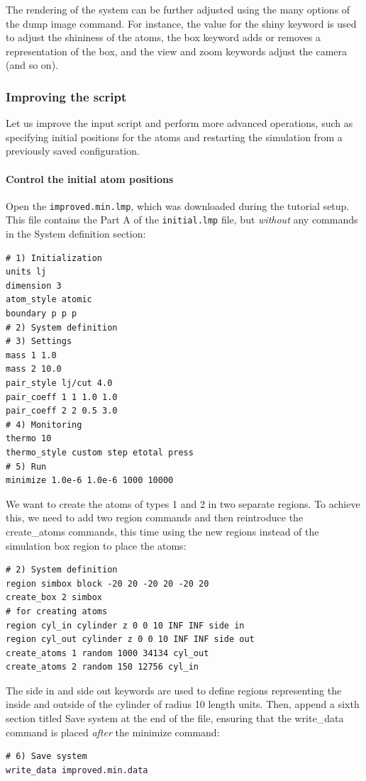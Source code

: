 \documentclass[9pt,tutorial]{livecoms}
\newcommand{\lmpcmd}[1]{\hspace{0pt}\colorbox{listing}{\textcolor{command}{\small{#1}}}\hspace{0pt}} %
\newcommand{\flecmd}[1]{\textcolor{command}{\texttt{#1}}} %
\begin{document}
The rendering of the system can be further adjusted using the many
options of the \lmpcmd{dump image} command.  For instance, the value for the
\lmpcmd{shiny} keyword is used to adjust the shininess of the atoms, the
\lmpcmd{box} keyword adds or removes a representation of the box, and
the \lmpcmd{view} and \lmpcmd{zoom} keywords adjust the camera (and so
on).

\subsubsection{Improving the script}

Let us improve the input script and perform more advanced operations,
such as specifying initial positions for the atoms and restarting the
simulation from a previously saved configuration.

\paragraph{Control the initial atom positions}

Open the \flecmd{improved.min.lmp}, which was downloaded during the
tutorial setup.  This file contains the \lmpcmd{Part A} of the
\flecmd{initial.lmp} file, but \emph{without} any
commands in the \lmpcmd{System definition} section:
\begin{lstlisting}
# 1) Initialization
units lj
dimension 3
atom_style atomic
boundary p p p
# 2) System definition
# 3) Settings
mass 1 1.0
mass 2 10.0
pair_style lj/cut 4.0
pair_coeff 1 1 1.0 1.0
pair_coeff 2 2 0.5 3.0
# 4) Monitoring
thermo 10
thermo_style custom step etotal press
# 5) Run
minimize 1.0e-6 1.0e-6 1000 10000
\end{lstlisting}

We want to create the atoms of types 1 and 2 in two separate
regions.  To achieve this, we need to add two \lmpcmd{region} commands and then
reintroduce the \lmpcmd{create\_atoms} commands, this time using the new
regions instead of the simulation box region to place the atoms:
\begin{lstlisting}
# 2) System definition
region simbox block -20 20 -20 20 -20 20
create_box 2 simbox
# for creating atoms
region cyl_in cylinder z 0 0 10 INF INF side in
region cyl_out cylinder z 0 0 10 INF INF side out
create_atoms 1 random 1000 34134 cyl_out
create_atoms 2 random 150 12756 cyl_in
\end{lstlisting}
The \lmpcmd{side in} and \lmpcmd{side out} keywords are used to define
regions representing the inside and outside of the cylinder of radius
10 length units.  Then, append a sixth section titled \lmpcmd{Save system} at the end
of the file, ensuring that the \lmpcmd{write\_data} command is placed \emph{after}
the \lmpcmd{minimize} command:
\begin{lstlisting}
# 6) Save system
write_data improved.min.data
\end{lstlisting}
\end{document}
